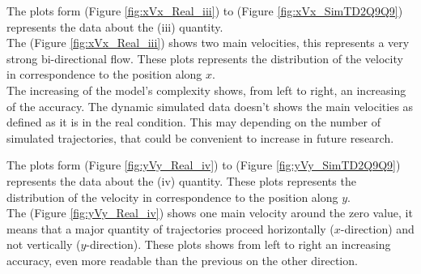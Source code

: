 \documentclass[class=article, crop=false]{standalone}
\begin{document}
The plots form (Figure \ref{fig:xVx_Real_iii}) to (Figure \ref{fig:xVx_SimTD2Q9Q9}) represents the data about the (iii) quantity.
\\ The (Figure \ref{fig:xVx_Real_iii}) shows two main velocities, this represents a very strong bi-directional flow.
These plots represents the distribution of the velocity in correspondence to the position along $x$.
\\ The increasing of the model's complexity shows, from left to right, an increasing of the accuracy.
The dynamic simulated data doesn't shows the main velocities as defined as it is in the real condition.
This may depending on the number of simulated trajectories, that could be convenient to increase in future research.

The plots form (Figure \ref{fig:yVy_Real_iv}) to (Figure \ref{fig:yVy_SimTD2Q9Q9}) represents the data about the (iv) quantity.
These plots represents the distribution of the velocity in correspondence to the position along $y$.
\\ The (Figure \ref{fig:yVy_Real_iv}) shows one main velocity around the zero value, it means that a major quantity of trajectories proceed horizontally ($x$-direction) and not vertically ($y$-direction).
These plots shows from left to right an increasing accuracy, even more readable than the previous on the other direction.
\end{document}
